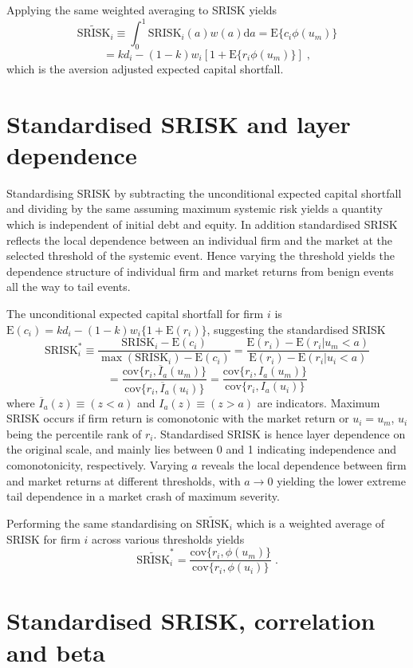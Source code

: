 \documentclass[authoryear]{elsarticle}
\newcommand{\E}{\mathrm{E}}
\newcommand{\cov}{\mathrm{cov}}
\newcommand{\de}{\mathrm{d}}
\begin{document}
Applying the same weighted averaging to SRISK yields
$$
\widetilde{\mathrm{SRISK}}_i \equiv \int_0^1 \mathrm{SRISK}_i(a) w(a) \de a = \E\{c_i\phi(u_m)\} 
$$
$$
= kd_i-(1-k)w_i[1+\E\{r_i\phi(u_m)\}] \;,
$$
which is the aversion adjusted expected capital shortfall.



\section{Standardised SRISK and layer dependence}

Standardising SRISK by subtracting the unconditional expected capital shortfall and dividing by the same assuming maximum systemic risk yields a quantity which is independent of initial debt and equity. In addition standardised SRISK reflects the local dependence between an individual firm and the market at the selected threshold of the systemic event. Hence varying the threshold yields the dependence structure of individual firm and market returns from benign events all the way to tail events.

The unconditional expected capital shortfall for firm $i$ is $\E(c_i)=kd_i-(1-k)w_i\{1+\E(r_i)\}$, suggesting the standardised SRISK
$$
\mathrm{SRISK}_i^* \equiv \frac{\mathrm{SRISK}_i-\E(c_i)}{\max(\mathrm{SRISK}_i)-\E(c_i)}
=\frac{\E(r_i)-\E(r_i|u_m<a)}{\E(r_i)-\E(r_i|u_i<a)}
$$
$$
=\frac{\cov\{r_i,\overline{I}_a(u_m)\}}{\cov\{r_i,\overline{I}_a(u_i)\}}
=\frac{\cov\{r_i,I_a(u_m)\}}{\cov\{r_i,I_a(u_i)\}} 
$$
where $\overline{I}_a(z)\equiv (z<a)$ and $I_a(z)\equiv (z>a)$ are indicators. Maximum SRISK occurs if firm return is comonotonic with the market return or $u_i=u_m$, $u_i$ being the percentile rank of $r_i$. Standardised SRISK is hence layer dependence on the original scale, and mainly lies between 0 and 1 indicating independence and comonotonicity, respectively. Varying $a$ reveals the local dependence between firm and market returns at different thresholds, with $a\rightarrow 0$ yielding the lower extreme tail dependence in a market crash of maximum severity.

Performing the same standardising on $\widetilde{\mathrm{SRISK}}_i$ which is a weighted average of SRISK for firm $i$ across various thresholds yields
$$
\widetilde{\mathrm{SRISK}}_i^* = \frac{\cov\{r_i,\phi(u_m)\}}{\cov\{r_i,\phi(u_i)\}}   \;.
$$

\section{Standardised SRISK, correlation and beta}
\end{document}

